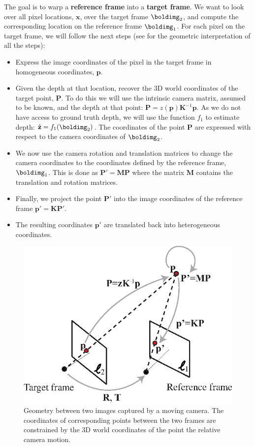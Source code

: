 The goal is to warp a {\bf reference frame} into a {\bf target frame}. 
We want to look over all pixel locations, $\mathbf{x}$, over the target frame $\boldimg_2$, and compute the corresponding location on the reference frame $\boldimg_1$. For each pixel on the target frame, we will follow the next steps (see \fig{\ref{fig:geometry_reconstruction}} for the geometric interpretation of all the steps):
\begin{itemize}
\item Express the image coordinates of the pixel in the target frame in homogeneous coordinates, $\mathbf{p}$.
\item Given the depth at that location, recover the 3D world coordinates of the target point, $\mathbf{P}$. To do this we will use the intrinsic camera matrix, assumed to be known, and the depth at that point: $\mathbf{P} = z(\mathbf{p}) \mathbf{K}^{-1} \mathbf{p}$. As we do not have access to ground truth depth, we will use the function $f_1$ to estimate depth: $\hat{\mathbf{z}} = f_1(\boldimg_2)$. The coordinates of the point $\mathbf{P}$ are expressed with respect to the camera coordinates of $\boldimg_2$. 
\item We now use the camera rotation and translation matrices to change the camera coordinates to the coordinates defined by the reference frame, $\boldimg_1$. This is done as $\mathbf{P}' = \mathbf{M}\mathbf{P}$ where the matrix $\mathbf{M}$ contains the translation and rotation matrices. 
\item Finally, we project the point $\mathbf{P}'$ into the image coordinates of the reference frame $\mathbf{p}' = \mathbf{K} \mathbf{P}'$. 
\item The resulting coordinates $\mathbf{p}'$ are translated back into heterogeneous coordinates.
\end{itemize}

\begin{figure}
\centerline{
\includegraphics[width=.6\linewidth]{figures/learning_3d/geometry_reconstruction_12.eps}
}
\caption{Geometry between two images captured by a moving camera. The coordinates of corresponding points between the two frames are constrained by the 3D world coordinates of the point the relative camera motion.}
\label{fig:geometry_reconstruction}
\end{figure}

